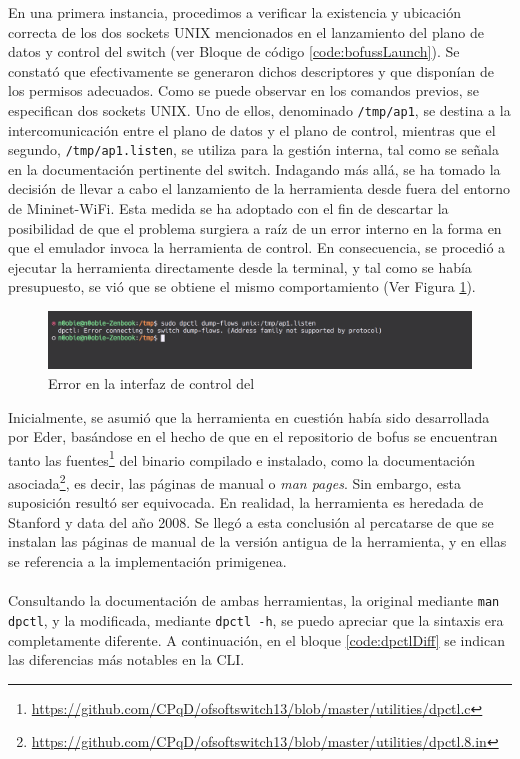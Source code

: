 En una primera instancia, procedimos a verificar la existencia y ubicación correcta de los dos sockets UNIX mencionados en el lanzamiento del plano de datos y control del switch (ver Bloque de código \ref{code:bofussLaunch}). Se constató que efectivamente se generaron dichos descriptores y que disponían de los permisos adecuados. Como se puede observar en los comandos previos, se especifican dos sockets UNIX. Uno de ellos, denominado \texttt{/tmp/ap1}, se destina a la intercomunicación entre el plano de datos y el plano de control, mientras que el segundo, \texttt{/tmp/ap1.listen}, se utiliza para la gestión interna, tal como se señala en la documentación pertinente del switch. Indagando más allá, se ha tomado la decisión de llevar a cabo el lanzamiento de la herramienta desde fuera del entorno de Mininet-WiFi. Esta medida se ha adoptado con el fin de descartar la posibilidad de que el problema surgiera a raíz de un error interno en la forma en que el emulador invoca la herramienta de control. En consecuencia, se procedió a ejecutar la herramienta directamente desde la terminal, y tal como se había presupuesto, se vió que se obtiene el mismo comportamiento (Ver Figura \ref{fig:dpctl_2}).\\

\begin{figure}[ht]
    \centering
    \includegraphics[width=\textwidth]{archivos/img/dev/dpctl_2.png}
    \caption{Error en la interfaz de control del }
    \label{fig:dpctl_2}
\end{figure}


Inicialmente, se asumió que la herramienta en cuestión había sido desarrollada por Eder, basándose en el hecho de que en el repositorio de \gls{bofus} se encuentran tanto las fuentes\footnote{\url{https://github.com/CPqD/ofsoftswitch13/blob/master/utilities/dpctl.c}} del binario compilado e instalado, como la documentación asociada\footnote{\url{https://github.com/CPqD/ofsoftswitch13/blob/master/utilities/dpctl.8.in}}, es decir, las páginas de manual o \textit{man pages}. Sin embargo, esta suposición resultó ser equivocada. En realidad, la herramienta es heredada de Stanford y data del año 2008. Se llegó a esta conclusión al percatarse de que se instalan las páginas de manual de la versión antigua de la herramienta, y en ellas se referencia a la implementación primigenea.\\
\\
Consultando la documentación de ambas herramientas, la original mediante \texttt{man dpctl}, y la modificada, mediante \texttt{dpctl -h}, se puedo apreciar que la sintaxis era completamente diferente. A continuación, en el bloque \ref{code:dpctlDiff} se indican las diferencias más notables en la CLI.

